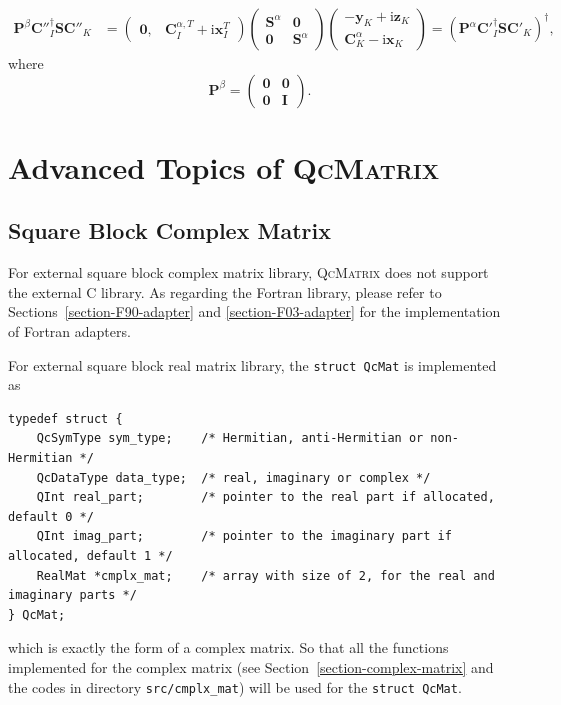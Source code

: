 \documentclass[a4paper,11pt,twoside,openright]{book}
\begin{document}
\begin{align}
%
  \mathbf{P}^{\beta}\mathbf{C}''^{\dagger}_{I}\mathbf{S}\mathbf{C}''_{K}
  &=\begin{pmatrix}
    \mathbf{0}, & \mathbf{C}^{\alpha,T}_{I}+\text{i}\mathbf{x}^{T}_{I}
  \end{pmatrix}
  \begin{pmatrix}
    \mathbf{S}^{\alpha} & \mathbf{0}\\
    \mathbf{0} & \mathbf{S}^{\alpha}
  \end{pmatrix}
  \begin{pmatrix}
    -\mathbf{y}_{K}+\text{i}\mathbf{z}_{K}\\
    \mathbf{C}^{\alpha}_{K}-\text{i}\mathbf{x}_{K}
  \end{pmatrix}%
  =\left(\mathbf{P}^{\alpha}\mathbf{C}'^{\dagger}_{I}\mathbf{S}\mathbf{C}'_{K}\right)^{\dagger},
\end{align}
where
\begin{equation}
  \mathbf{P}^{\beta}
  =\begin{pmatrix}
    \mathbf{0} & \mathbf{0}\\
    \mathbf{0} & \mathbf{I}
  \end{pmatrix}.
\end{equation}

\chapter{Advanced Topics of \textsc{QcMatrix}}
\label{chapter-QcMatrix-advanced}

\section{Square Block Complex Matrix}
\label{section-QcMat}

For external square block complex matrix library, \textsc{QcMatrix} does not
support the external C library. As regarding the Fortran library, please
refer to Sections~\ref{section-F90-adapter} and \ref{section-F03-adapter}
for the implementation of Fortran adapters.

For external square block real matrix library, the \verb|struct QcMat| is implemented as
\begin{verbatim}
typedef struct {
    QcSymType sym_type;    /* Hermitian, anti-Hermitian or non-Hermitian */
    QcDataType data_type;  /* real, imaginary or complex */
    QInt real_part;        /* pointer to the real part if allocated, default 0 */
    QInt imag_part;        /* pointer to the imaginary part if allocated, default 1 */
    RealMat *cmplx_mat;    /* array with size of 2, for the real and imaginary parts */
} QcMat;
\end{verbatim}
which is exactly the form of a complex matrix. So that all the functions implemented
for the complex matrix (see Section~\ref{section-complex-matrix} and the codes in
directory \verb|src/cmplx_mat|) will be used for the \verb|struct QcMat|.
\end{document}
